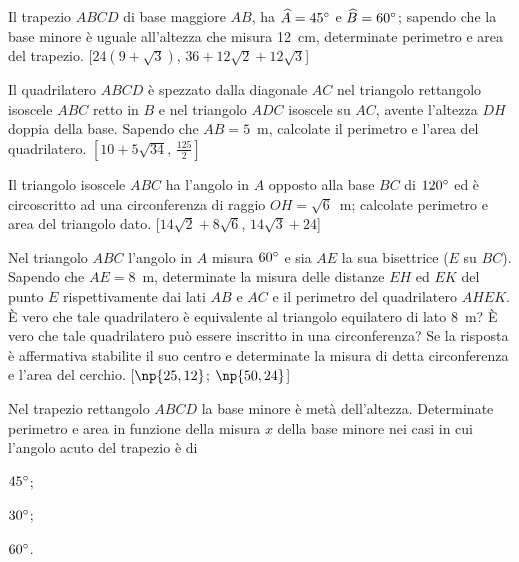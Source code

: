 \begin{multicols}{2}
\begin{esercizio}
\label{ese:7.29}
Il trapezio $ABCD$ di base maggiore $AB$, ha $\widehat{A}=45{}^{\circ}$ e $\widehat{B}=60{}^{\circ}$; sapendo che la base minore è uguale all'altezza che misura 12~cm, determinate perimetro e area del trapezio. [$24(9+\sqrt{3})$, $36+12\sqrt{2}+12\sqrt{3}$]
\end{esercizio}

\begin{esercizio}
\label{ese:7.30}
Il quadrilatero $ABCD$ è spezzato dalla diagonale $AC$ nel triangolo rettangolo isoscele $ABC$ retto in $B$ e nel triangolo $ADC$ isoscele su $AC$, avente l'altezza $DH$ doppia della base. Sapendo che $AB=5$~m, calcolate il perimetro e l'area del quadrilatero.
$\left[10+5\sqrt{34}\text{, }\frac{125}{2}\right]$
\end{esercizio}

\begin{esercizio}
\label{ese:7.31}
Il triangolo isoscele $ABC$ ha l'angolo in $A$ opposto alla base $BC$ di $120{}^{\circ}$ ed è circoscritto ad una circonferenza di raggio $OH=\sqrt{6}$~m; calcolate perimetro e area del triangolo dato.  	
[$14\sqrt{2}+8\sqrt{6}$, $14\sqrt{3}+24$]
\end{esercizio}

\begin{esercizio}
\label{ese:7.32}
Nel triangolo $ABC$ l'angolo in $A$ misura $60{}^{\circ}$ e sia $AE$ la sua bisettrice ($E$ su $BC$). Sapendo che $AE=8$~m, determinate la misura delle distanze $EH$ ed $EK$ del punto $E$ rispettivamente dai lati $AB$ e $AC$ e il perimetro del quadrilatero $AHEK$. \`E vero che tale quadrilatero è equivalente al triangolo equilatero di lato 8~m? \`E vero che tale quadrilatero può essere inscritto in una circonferenza? Se la risposta è affermativa stabilite il suo centro e determinate la misura di detta circonferenza e l'area del cerchio. 
[$\np{25,12}$; $\np{50,24}$]
\end{esercizio}

\begin{esercizio}
\label{ese:7.33}
Nel trapezio rettangolo $ABCD$ la base minore è metà dell'altezza. Determinate perimetro e area in funzione della misura $x$ della base minore nei casi in cui l'angolo acuto del trapezio è di
\begin{enumeratea}
\item $45{}^{\circ}$;
\item $30{}^{\circ}$;
\item $60{}^{\circ}$.
\end{enumeratea}
\end{esercizio}


\end{multicols}
